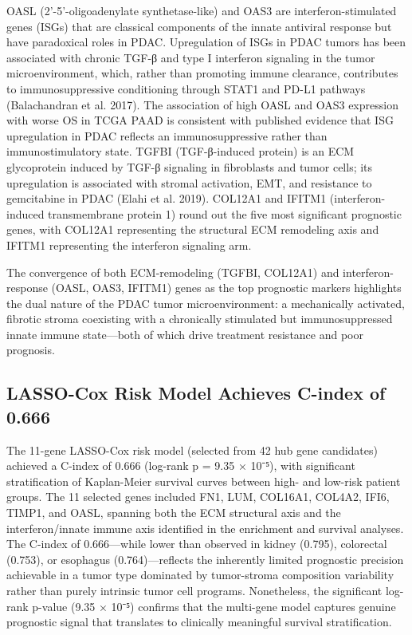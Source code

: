 \documentclass[
  12pt,
]{article}
\begin{document}
OASL (2'-5'-oligoadenylate synthetase-like) and OAS3 are
interferon-stimulated genes (ISGs) that are classical components of the
innate antiviral response but have paradoxical roles in PDAC.
Upregulation of ISGs in PDAC tumors has been associated with chronic
TGF-β and type I interferon signaling in the tumor microenvironment,
which, rather than promoting immune clearance, contributes to
immunosuppressive conditioning through STAT1 and PD-L1 pathways
(Balachandran et al. 2017). The association of high OASL and OAS3
expression with worse OS in TCGA PAAD is consistent with published
evidence that ISG upregulation in PDAC reflects an immunosuppressive
rather than immunostimulatory state. TGFBI (TGF-β-induced protein) is an
ECM glycoprotein induced by TGF-β signaling in fibroblasts and tumor
cells; its upregulation is associated with stromal activation, EMT, and
resistance to gemcitabine in PDAC (Elahi et al. 2019). COL12A1 and
IFITM1 (interferon-induced transmembrane protein 1) round out the five
most significant prognostic genes, with COL12A1 representing the
structural ECM remodeling axis and IFITM1 representing the interferon
signaling arm.

The convergence of both ECM-remodeling (TGFBI, COL12A1) and
interferon-response (OASL, OAS3, IFITM1) genes as the top prognostic
markers highlights the dual nature of the PDAC tumor microenvironment: a
mechanically activated, fibrotic stroma coexisting with a chronically
stimulated but immunosuppressed innate immune state---both of which
drive treatment resistance and poor prognosis.

\subsection{LASSO-Cox Risk Model Achieves C-index of
0.666}\label{lasso-cox-risk-model-achieves-c-index-of-0.666}

The 11-gene LASSO-Cox risk model (selected from 42 hub gene candidates)
achieved a C-index of 0.666 (log-rank p = 9.35 × 10⁻⁵), with significant
stratification of Kaplan-Meier survival curves between high- and
low-risk patient groups. The 11 selected genes included FN1, LUM,
COL16A1, COL4A2, IFI6, TIMP1, and OASL, spanning both the ECM structural
axis and the interferon/innate immune axis identified in the enrichment
and survival analyses. The C-index of 0.666---while lower than observed
in kidney (0.795), colorectal (0.753), or esophagus (0.764)---reflects
the inherently limited prognostic precision achievable in a tumor type
dominated by tumor-stroma composition variability rather than purely
intrinsic tumor cell programs. Nonetheless, the significant log-rank
p-value (9.35 × 10⁻⁵) confirms that the multi-gene model captures
genuine prognostic signal that translates to clinically meaningful
survival stratification.
\end{document}
